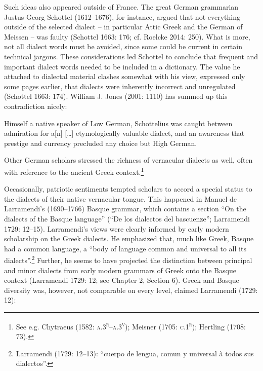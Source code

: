 \begin{styleStandard}
Such ideas also appeared outside of France. The great German grammarian Justus Georg Schottel (1612–1676), for instance, argued that not everything outside of the selected dialect – in particular Attic Greek and the German of Meissen – was faulty (Schottel 1663: 176; cf. Roelcke 2014: 250). What is more, not all dialect words must be avoided, since some could be current in certain technical jargons. These considerations led Schottel to conclude that frequent and important dialect words needed to be included in a dictionary. The value he attached to dialectal material clashes somewhat with his view, expressed only some pages earlier, that dialects were inherently incorrect and unregulated (Schottel 1663: 174). William J. Jones (2001: 1110) has summed up this contradiction nicely:
\end{styleStandard}

\begin{styleQuote}
Himself a native speaker of Low German, Schottelius was caught between admiration for a[n] […] etymologically valuable dialect, and an awareness that prestige and currency precluded any choice but High German.
\end{styleQuote}

\begin{styleStandard}
Other German scholars stressed the richness of vernacular dialects as well, often with reference to the ancient Greek context.\footnote{ See e.g. Chytraeus (1582: \textsc{a.3}\textsc{\textsuperscript{r}}\textsc{–a.3}\textsc{\textsuperscript{v}}); Meisner (1705: \textsc{c.1}\textsc{\textsuperscript{r}}); Hertling (1708: 73).}
\end{styleStandard}

\begin{styleStandard}
Occasionally, patriotic sentiments tempted scholars to accord a special status to the dialects of their native vernacular tongue. This happened in Manuel de Larramendi’s (1690–1766) Basque grammar, which contains a section “On the dialects of the Basque language” (“De los dialectos del bascuenze”; Larramendi 1729: 12–15). Larramendi’s views were clearly informed by early modern scholarship on the Greek dialects. He emphasized that, much like Greek, Basque had a common language, a “body of language common and universal to all its dialects”.\footnote{ Larramendi (1729: 12–13): “cuerpo de lengua, comun y universal à todos sus dialectos”.} Further, he seems to have projected the distinction between principal and minor dialects from early modern grammars of Greek onto the Basque context (Larramendi 1729: 12; see Chapter 2, Section 6). Greek and Basque diversity was, however, not comparable on every level, claimed Larramendi (1729: 12):
\end{styleStandard}

